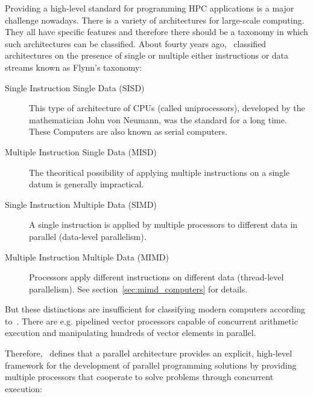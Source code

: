 Providing a high-level standard for programming HPC applications is a
major challenge nowadays. There is a variety of architectures for
large-scale computing. They all have specific features and 
therefore there should be a taxonomy in which such architectures can
be classified. About fourty years ago, \cite{flynn72sco}~classified
architectures on the
presence of single or multiple either instructions or data streams
known as Flynn's taxonomy:
\begin{description}
\item[Single Instruction Single Data (SISD)]
  This type of architecture of CPUs (called uniprocessors),
  developed by the 
  mathematician John von Neumann, was the standard for a long
  time. These Computers are also known as serial computers. 
\item[Multiple Instruction Single Data (MISD)] The theoritical possibility
  of applying multiple instructions on a single datum is generally
  impractical.
\item[Single Instruction Multiple Data (SIMD)] 
  A single instruction is applied by multiple processors to different
  data in parallel (data-level parallelism). 
\item[Multiple Instruction Multiple Data (MIMD)] Processors apply
  different instructions on different data (thread-level
  parallelism). See section~\ref{sec:mimd_computers} for details. 
\end{description}

But these distinctions are insufficient for classifying modern
computers according to~\cite{duncan90survey}. There are e.g.
pipelined vector processors capable of concurrent arithmetic execution and
manipulating hundreds of vector elements in parallel.

Therefore,~\cite{duncan90survey} defines that a parallel architecture
provides an explicit, high-level framework for 
the development of parallel programming solutions by providing
multiple processors that cooperate to solve problems through
concurrent execution:

